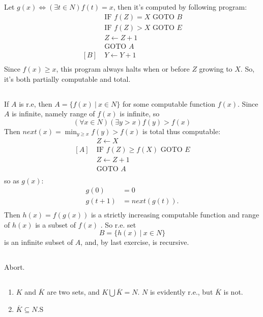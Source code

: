 \subsection{}
Let $ g(x) \Leftrightarrow (\exists t\in N)f(t)=x $, then it's computed by
following program:
\begin{align*}
  [A]\ & \text{IF } f(Z)=X \text{ GOTO } B \\
       & \text{IF } f(Z)>X \text{ GOTO } E \\
       & Z \gets Z + 1 \\
       & \text{GOTO } A \\
  [B]\ & Y \gets Y + 1 \\
\end{align*}
Since $ f(x)\ge x $, this program always halts when or before $Z$ growing
to $X$. So, it's both partially computable and total.


\subsection{}
If $A$ is r.e, then $ A = \{ f(x)\ |\ x\in N \} $ for some computable function
$f(x)$. Since $A$ is infinite, namely range of $f(x)$ is infinite, so
\[ (\forall x\in N)(\exists y>x)f(y)>f(x) \]
Then $ next(x) = \min_{y\ge x} f(y)>f(x) $ is total thus computable:
\begin{align*}
       & Z \gets X \\
  [A]\ & \text{IF } f(Z)\ge f(X) \text{ GOTO } E \\
       & Z \gets Z + 1 \\
       & \text{GOTO } A \\
\end{align*}
so as $g(x)$:
\begin{align*}
  g(0)   & = 0 \\
  g(t+1) & = next(g(t)) .\\
\end{align*}
Then $ h(x) = f(g(x)) $ is a strictly increasing computable function and 
range of $h(x)$ is a subset of $f(x)$ . So r.e. set
\[ B = \{ h(x)\ |\ x\in N \} \]
is an infinite subset of $A$, and, by last exercise, is recursive.


\subsection{}
Abort.


\subsection{}
\begin{enumerate}
  \item 
  $K$ and $\overline{K}$ are two sets, and $ K \bigcup \overline{K} = N $. $N$ is evidently
  r.e., but $ \overline{K} $ is not.
  
  \item 
  $ \overline{K} \subseteq N $.S
\end{enumerate}

